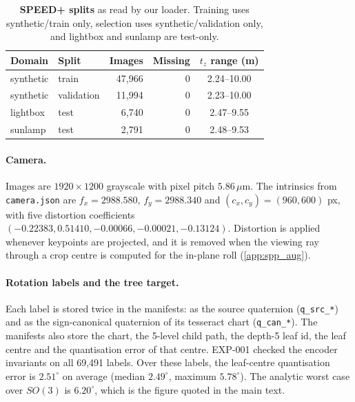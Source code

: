 \begin{table}[t]
  \centering\footnotesize
  \setlength{\tabcolsep}{3pt}
  \begin{tabular}{llrrc}
    \toprule
    Domain & Split & Images & Missing & $t_z$ range (m) \\
    \midrule
    synthetic & train      & 47{,}966 & 0 & 2.24--10.00 \\
    synthetic & validation & 11{,}994 & 0 & 2.23--10.00 \\
    lightbox  & test       &  6{,}740 & 0 & 2.47--9.55 \\
    sunlamp   & test       &  2{,}791 & 0 & 2.48--9.53 \\
    \bottomrule
  \end{tabular}
  \caption{\textbf{SPEED+ splits} as read by our loader. Training uses synthetic/train only, selection uses synthetic/validation only, and lightbox and sunlamp are test-only.}
  \label{app:tab:spp_splits}
\end{table}

\paragraph{Camera.}
Images are $1920\times1200$ grayscale with pixel pitch $5.86\,\mu$m. The intrinsics from \texttt{camera.json} are $f_x=2988.580$, $f_y=2988.340$ and $(c_x,c_y)=(960,600)$ px, with five distortion coefficients $(-0.22383, 0.51410, -0.00066, -0.00021, -0.13124)$. Distortion is applied whenever keypoints are projected, and it is removed when the viewing ray through a crop centre is computed for the in-plane roll (\cref{app:spp_aug}).

\paragraph{Rotation labels and the tree target.}
Each label is stored twice in the manifests: as the source quaternion (\texttt{q\_src\_*}) and as the sign-canonical quaternion of its tesseract chart (\texttt{q\_can\_*}). The manifests also store the chart, the 5-level child path, the depth-5 leaf id, the leaf centre and the quantisation error of that centre. EXP-001 checked the encoder invariants on all 69{,}491 labels. Over these labels, the leaf-centre quantisation error is $2.51^\circ$ on average (median $2.49^\circ$, maximum $5.78^\circ$). The analytic worst case over $SO(3)$ is $6.20^\circ$, which is the figure quoted in the main text.

